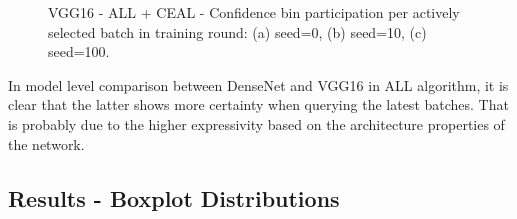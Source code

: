 \begin{figure}[ht!]
    \centering
    \caption{VGG16 - ALL + CEAL - Confidence bin participation per actively selected batch in training round: (a) seed=0, (b) seed=10, (c) seed=100.}
    \label{c5:figure_al_loop_pseudolabels_participation_vgg}
\end{figure}

In model level comparison between DenseNet and VGG16 in ALL algorithm, it is clear that the latter shows more certainty when querying the latest batches. That is probably due to the higher expressivity based on the architecture properties of the network.

\subsection{Results - Boxplot Distributions}

